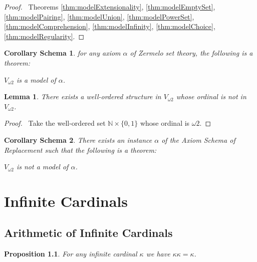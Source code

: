 \documentclass{book}
\let\qed\relax
\newtheorem{prop}[ax]{Proposition}
\newtheorem{cors}{Corollary Schema}[ax]
\newtheorem{lm}[ax]{Lemma}
\theoremstyle{definition}
\begin{document}
\begin{proof}
\pf\ Theorems \ref{thm:modelExtensionality}, \ref{thm:modelEmptySet}, \ref{thm:modelPairing}, \ref{thm:modelUnion}, \ref{thm:modelPowerSet}, \ref{thm:modelComprehension}, \ref{thm:modelInfinity}, \ref{thm:modelChoice}, \ref{thm:modelRegularity}. \qed
\end{proof}

\begin{cors}
\label{cor:modelZermelo}
for any axiom $\alpha$ of Zermelo set theory, the following is a theorem:

$V_{\omega 2}$ is a model of $\alpha$.
\end{cors}

\begin{lm}
There exists a well-ordered structure in $V_{\omega 2}$ whose ordinal is not in $V_{\omega 2}$.
\end{lm}

\begin{proof}
\pf\ Take the well-ordered set $\mathbb{N} \times \{0,1\}$ whose ordinal is $\omega 2$. \qed
\end{proof}

\begin{cors}
There exists an instance $\alpha$ of the Axiom Schema of Replacement such that the following is a theorem:

$V_{\omega 2}$ is not a model of $\alpha$.
\end{cors}

\chapter{Infinite Cardinals}

\section{Arithmetic of Infinite Cardinals}

\begin{prop}
\label{prop:kappasquared}
For any infinite cardinal $\kappa$ we have $\kappa \kappa = \kappa$.
\end{prop}
\end{document}
